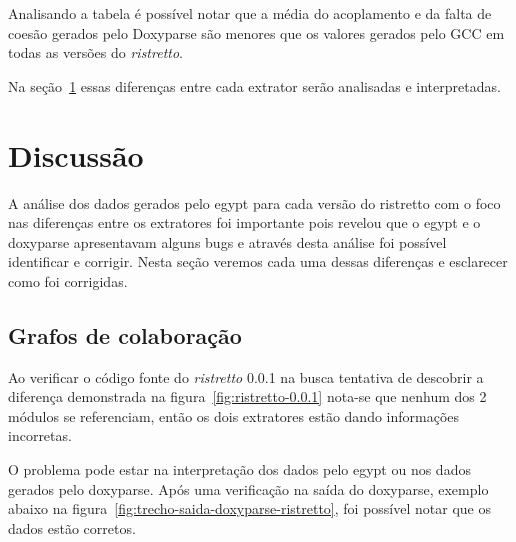 Analisando a tabela é possível notar que a média do acoplamento e da falta de
coesão gerados pelo Doxyparse são menores que os valores gerados pelo GCC em
todas as versões do {\it ristretto}.

Na seção~\ref{sec:discussao} essas diferenças entre cada extrator serão
analisadas e interpretadas.

\section{Discussão} \label{sec:discussao}

A análise dos dados gerados pelo egypt para cada versão do ristretto com o foco
nas diferenças entre os extratores foi importante pois revelou que o egypt e o
doxyparse apresentavam alguns bugs e através desta análise foi possível
identificar e corrigir. Nesta seção veremos cada uma dessas diferenças e
esclarecer como foi corrigidas.

\subsection{Grafos de colaboração}

Ao verificar o código fonte do {\it ristretto} 0.0.1 na busca tentativa de
descobrir a diferença demonstrada na figura~\ref{fig:ristretto-0.0.1} nota-se
que nenhum dos 2 módulos se referenciam, então os dois extratores estão dando
informações incorretas.

O problema pode estar na interpretação dos dados pelo egypt ou nos dados
gerados pelo doxyparse. Após uma verificação na saída do doxyparse, exemplo
abaixo na figura~\ref{fig:trecho-saida-doxyparse-ristretto}, foi possível notar
que os dados estão corretos.

